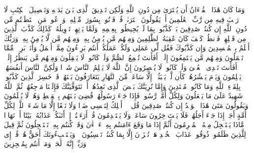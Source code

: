 \startbuffer[\q:10:37]
وَمَا كَانَ هَٰذَا ٱلۡقُرۡءَانُ أَن یُفۡتَرَىٰ مِن دُونِ ٱللَّهِ وَلَٰكِن تَصۡدِیقَ ٱلَّذِی بَیۡنَ یَدَیۡهِ وَتَفۡصِیلَ ٱلۡكِتَٰبِ لَا رَیۡبَ فِیهِ مِن رَّبِّ ٱلۡعَٰلَمِینَ%
\stopbuffer
\startbuffer[\q:10:38]
أَمۡ یَقُولُونَ ٱفۡتَرَىٰهُۖ قُلۡ فَأۡتُوا۟ بِسُورَةࣲ مِّثۡلِهِۦ وَٱدۡعُوا۟ مَنِ ٱسۡتَطَعۡتُم مِّن دُونِ ٱللَّهِ إِن كُنتُمۡ صَٰدِقِینَ%
\stopbuffer
\startbuffer[\q:10:39]
بَلۡ كَذَّبُوا۟ بِمَا لَمۡ یُحِیطُوا۟ بِعِلۡمِهِۦ وَلَمَّا یَأۡتِهِمۡ تَأۡوِیلُهُۥۚ كَذَٰلِكَ كَذَّبَ ٱلَّذِینَ مِن قَبۡلِهِمۡۖ فَٱنظُرۡ كَیۡفَ كَانَ عَٰقِبَةُ ٱلظَّٰلِمِینَ%
\stopbuffer
\startbuffer[\q:10:40]
وَمِنۡهُم مَّن یُؤۡمِنُ بِهِۦ وَمِنۡهُم مَّن لَّا یُؤۡمِنُ بِهِۦۚ وَرَبُّكَ أَعۡلَمُ بِٱلۡمُفۡسِدِینَ%
\stopbuffer
\startbuffer[\q:10:41]
وَإِن كَذَّبُوكَ فَقُل لِّی عَمَلِی وَلَكُمۡ عَمَلُكُمۡۖ أَنتُم بَرِیۤءُونَ مِمَّاۤ أَعۡمَلُ وَأَنَا۠ بَرِیۤءࣱ مِّمَّا تَعۡمَلُونَ%
\stopbuffer
\startbuffer[\q:10:42]
وَمِنۡهُم مَّن یَسۡتَمِعُونَ إِلَیۡكَۚ أَفَأَنتَ تُسۡمِعُ ٱلصُّمَّ وَلَوۡ كَانُوا۟ لَا یَعۡقِلُونَ%
\stopbuffer
\startbuffer[\q:10:43]
وَمِنۡهُم مَّن یَنظُرُ إِلَیۡكَۚ أَفَأَنتَ تَهۡدِی ٱلۡعُمۡیَ وَلَوۡ كَانُوا۟ لَا یُبۡصِرُونَ%
\stopbuffer
\startbuffer[\q:10:44]
إِنَّ ٱللَّهَ لَا یَظۡلِمُ ٱلنَّاسَ شَیۡءࣰا وَلَٰكِنَّ ٱلنَّاسَ أَنفُسَهُمۡ یَظۡلِمُونَ%
\stopbuffer
\startbuffer[\q:10:45]
وَیَوۡمَ یَحۡشُرُهُمۡ كَأَن لَّمۡ یَلۡبَثُوۤا۟ إِلَّا سَاعَةࣰ مِّنَ ٱلنَّهَارِ یَتَعَارَفُونَ بَیۡنَهُمۡۚ قَدۡ خَسِرَ ٱلَّذِینَ كَذَّبُوا۟ بِلِقَاۤءِ ٱللَّهِ وَمَا كَانُوا۟ مُهۡتَدِینَ%
\stopbuffer
\startbuffer[\q:10:46]
وَإِمَّا نُرِیَنَّكَ بَعۡضَ ٱلَّذِی نَعِدُهُمۡ أَوۡ نَتَوَفَّیَنَّكَ فَإِلَیۡنَا مَرۡجِعُهُمۡ ثُمَّ ٱللَّهُ شَهِیدٌ عَلَىٰ مَا یَفۡعَلُونَ%
\stopbuffer
\startbuffer[\q:10:47]
وَلِكُلِّ أُمَّةࣲ رَّسُولࣱۖ فَإِذَا جَاۤءَ رَسُولُهُمۡ قُضِیَ بَیۡنَهُم بِٱلۡقِسۡطِ وَهُمۡ لَا یُظۡلَمُونَ%
\stopbuffer
\startbuffer[\q:10:48]
وَیَقُولُونَ مَتَىٰ هَٰذَا ٱلۡوَعۡدُ إِن كُنتُمۡ صَٰدِقِینَ%
\stopbuffer
\startbuffer[\q:10:49]
قُل لَّاۤ أَمۡلِكُ لِنَفۡسِی ضَرࣰّا وَلَا نَفۡعًا إِلَّا مَا شَاۤءَ ٱللَّهُۗ لِكُلِّ أُمَّةٍ أَجَلٌۚ إِذَا جَاۤءَ أَجَلُهُمۡ فَلَا یَسۡتَءۡخِرُونَ سَاعَةࣰ وَلَا یَسۡتَقۡدِمُونَ%
\stopbuffer
\startbuffer[\q:10:50]
قُلۡ أَرَءَیۡتُمۡ إِنۡ أَتَىٰكُمۡ عَذَابُهُۥ بَیَٰتًا أَوۡ نَهَارࣰا مَّاذَا یَسۡتَعۡجِلُ مِنۡهُ ٱلۡمُجۡرِمُونَ%
\stopbuffer
\startbuffer[\q:10:51]
أَثُمَّ إِذَا مَا وَقَعَ ءَامَنتُم بِهِۦۤۚ ءَاۤلۡءَٰنَ وَقَدۡ كُنتُم بِهِۦ تَسۡتَعۡجِلُونَ%
\stopbuffer
\startbuffer[\q:10:52]
ثُمَّ قِیلَ لِلَّذِینَ ظَلَمُوا۟ ذُوقُوا۟ عَذَابَ ٱلۡخُلۡدِ هَلۡ تُجۡزَوۡنَ إِلَّا بِمَا كُنتُمۡ تَكۡسِبُونَ%
\stopbuffer
\startbuffer[\q:10:53]
۞ وَیَسۡتَنۢبِءُونَكَ أَحَقٌّ هُوَۖ قُلۡ إِی وَرَبِّیۤ إِنَّهُۥ لَحَقࣱّۖ وَمَاۤ أَنتُم بِمُعۡجِزِینَ%
